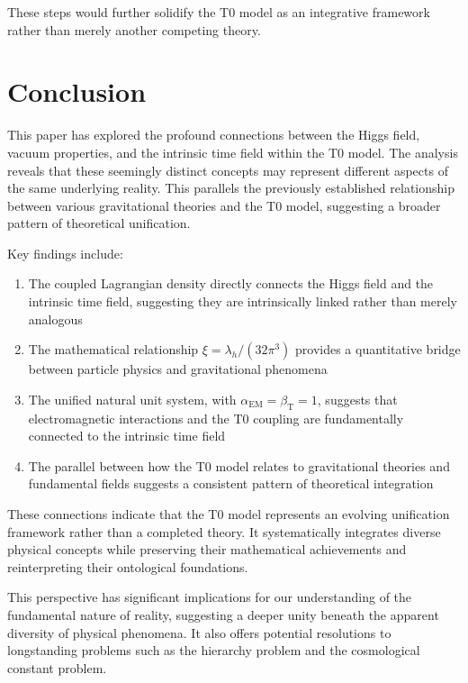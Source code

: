\documentclass[12pt,a4paper]{article}
\newcommand{\alphaEM}{\alpha_{\text{EM}}}
\newcommand{\betaT}{\beta_{\text{T}}}
\begin{document}
	These steps would further solidify the T0 model as an integrative framework rather than merely another competing theory.
	
	\section{Conclusion}
	\label{sec:conclusion}
	
	This paper has explored the profound connections between the Higgs field, vacuum properties, and the intrinsic time field within the T0 model. The analysis reveals that these seemingly distinct concepts may represent different aspects of the same underlying reality. This parallels the previously established relationship between various gravitational theories and the T0 model, suggesting a broader pattern of theoretical unification.
	
	Key findings include:
	
	\begin{enumerate}
		\item The coupled Lagrangian density directly connects the Higgs field and the intrinsic time field, suggesting they are intrinsically linked rather than merely analogous
		
		\item The mathematical relationship $\xi = \lambda_h/(32\pi^3)$ provides a quantitative bridge between particle physics and gravitational phenomena
		
		\item The unified natural unit system, with $\alphaEM = \betaT = 1$, suggests that electromagnetic interactions and the T0 coupling are fundamentally connected to the intrinsic time field
		
		\item The parallel between how the T0 model relates to gravitational theories and fundamental fields suggests a consistent pattern of theoretical integration
	\end{enumerate}
	
	These connections indicate that the T0 model represents an evolving unification framework rather than a completed theory. It systematically integrates diverse physical concepts while preserving their mathematical achievements and reinterpreting their ontological foundations.
	
	This perspective has significant implications for our understanding of the fundamental nature of reality, suggesting a deeper unity beneath the apparent diversity of physical phenomena. It also offers potential resolutions to longstanding problems such as the hierarchy problem and the cosmological constant problem.
	
\end{document}
